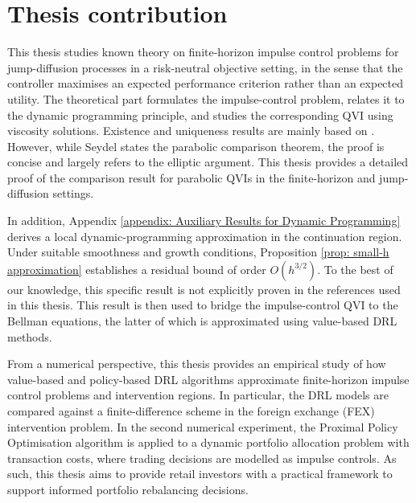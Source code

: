 \section*{Thesis contribution}
This thesis studies known theory on finite-horizon impulse control problems for jump-diffusion processes in a risk-neutral objective setting, in the sense that the controller maximises an expected performance criterion rather than an expected utility. The theoretical part formulates the impulse-control problem, relates it to the dynamic programming principle, and studies the corresponding QVI using viscosity solutions. Existence and uniqueness results are mainly based on \textcite{seydel2010generalexistenceuniquenessviscosity}. However, while Seydel states the parabolic comparison theorem, the proof is concise and largely refers to the elliptic argument. This thesis provides a detailed proof of the comparison result for parabolic QVIs in the finite-horizon and jump-diffusion settings.

In addition, Appendix \ref{appendix: Auxiliary Results for Dynamic Programming} derives a local dynamic-programming approximation in the continuation region. Under suitable smoothness and growth conditions, Proposition \ref{prop: small-h approximation} establishes a residual bound of order $O(h^{3/2})$. To the best of our knowledge, this specific result is not explicitly proven in the references used in this thesis. This result is then used to bridge the impulse-control QVI to the Bellman equations, the latter of which is approximated using value-based DRL methods.

From a numerical perspective, this thesis provides an empirical study of how value-based and policy-based DRL algorithms approximate finite-horizon impulse control problems and intervention regions. In particular, the DRL models are compared against a finite-difference scheme in the foreign exchange (FEX) intervention problem. In the second numerical experiment, the Proximal Policy Optimisation algorithm is applied to a dynamic portfolio allocation problem with transaction costs, where trading decisions are modelled as impulse controls. As such, this thesis aims to provide retail investors with a practical framework to support informed portfolio rebalancing decisions.

